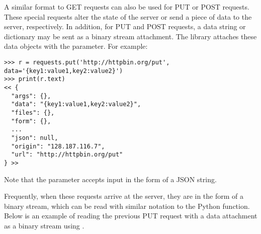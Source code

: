 \begin{comment}
\begin{problem}
The file \texttt{waterserver.py} is an example of a simple HTTP server using the Python submodules \li{http.server} and \li{urllib.parse}.
It stores a small sampling of water information from the first problem.
When a client submits a GET request with a query for a particular zip code, the server returns a list of the water usage for that zip code from 2005-2012.

For example, the following code returns the message \li{'[32, 36, 34, 32, 27, 26, 36, 16]'} from the server.

\begin{lstlisting}
# Option 1 - Include query in the URL (? signifies start of query)
r = requests.get("http://localhost:8000?zip=91342").text
# Option 2 - Use requests library to append query to URL
r = requests.get("http://localhost:8000", params={'zip':91342}).text
\end{lstlisting}
All messages from the server are formatted as JSON strings.

Expand the functionality of the server to accept a request with \li{'zip=all'} and return a JSON string of the \li{data} dictionary in \texttt{waterserver.py}.
\end{problem}
\end{comment}

A similar format to GET requests can also be used for PUT or POST requests.
These special requests alter the state of the server or send a piece of data to the server, respectively.
In addition, for PUT and POST requests, a data string or dictionary may be sent as a binary stream attachment.
The  library attaches these data objects with the  parameter.
For example:

\begin{lstlisting}
>>> r = requests.put('http://httpbin.org/put', data='{key1:value1,key2:value2}')
>>> print(r.text)
<< {
  "args": {},
  "data": "{key1:value1,key2:value2}",
  "files": {},
  "form": {},
  ...
  "json": null,
  "origin": "128.187.116.7",
  "url": "http://httpbin.org/put"
} >>

\end{lstlisting}

Note that the  parameter accepts input in the form of a JSON string.

Frequently, when these requests arrive at the server, they are in the form of a binary stream, which can be read with similar notation to the Python  function.
Below is an example of reading the previous PUT request with a data attachment as a binary stream using .

